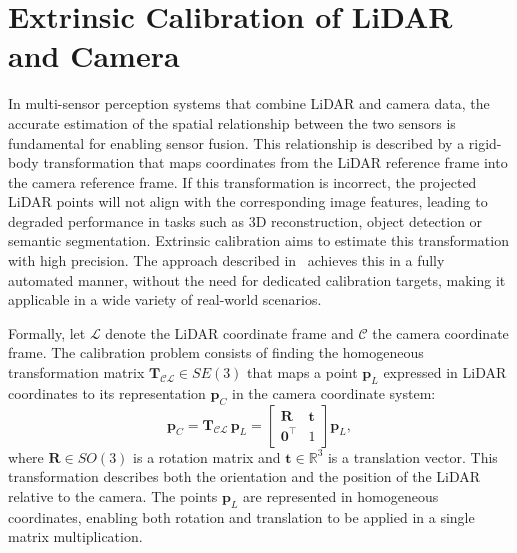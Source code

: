 \documentclass[english, bachelor, utf8]{base/thesis_telematics}
\begin{document}

\section{Extrinsic Calibration of LiDAR and Camera}
\label{sec:extrinsic_calib}

In multi-sensor perception systems that combine LiDAR and camera data, the accurate estimation of the spatial 
relationship between the two sensors is fundamental for enabling sensor fusion. This relationship is described 
by a rigid-body transformation that maps coordinates from the LiDAR reference frame into the camera reference frame. 
If this transformation is incorrect, the projected LiDAR points will not align with the corresponding image features, 
leading to degraded performance in tasks such as 3D reconstruction, object detection or semantic segmentation. 
Extrinsic calibration aims to estimate this transformation with high precision. The approach described in~\cite{beltran2022automatic} 
achieves this in a fully automated manner, without the need for dedicated calibration targets, making it applicable in a wide variety 
of real-world scenarios.

Formally, let $\mathcal{L}$ denote the LiDAR coordinate frame and $\mathcal{C}$ the camera coordinate frame. 
The calibration problem consists of finding the homogeneous transformation matrix $\mathbf{T}_{\mathcal{CL}} \in SE(3)$ that maps a 
point $\mathbf{p}_L$ expressed in LiDAR coordinates to its representation $\mathbf{p}_C$ in the camera coordinate system:
\begin{equation}
\mathbf{p}_C =
\mathbf{T}_{\mathcal{CL}} \, \mathbf{p}_L
= \begin{bmatrix} \mathbf{R} & \mathbf{t} \\ \mathbf{0}^\top & 1 \end{bmatrix} \mathbf{p}_L,
\label{eq:extrinsic_transformation}
\end{equation}
where $\mathbf{R} \in SO(3)$ is a rotation matrix and $\mathbf{t} \in \mathbb{R}^3$ is a translation vector. 
This transformation describes both the orientation and the position of the LiDAR relative to the camera. 
The points $\mathbf{p}_L$ are represented in homogeneous coordinates, enabling both rotation and translation to be applied in a single 
matrix multiplication.
\end{document}
